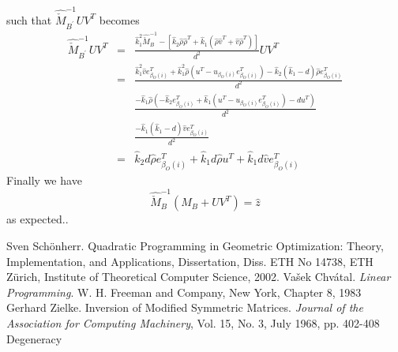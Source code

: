 \documentclass[a4paper]{article}
\begin{document}
such that $\hat{\check{M}}_{B^{\prime}}^{-1}UV^{T}$ becomes
\begin{eqnarray}
\hat{\check{M}}_{B^{\prime}}^{-1}UV^{T}
&=&
\frac{
\hat{k}_{1}^{2}\hat{\check{M}}_{B}^{-1}
-\left[
  \hat{k}_{2}\hat{\rho}\hat{\rho}^{T}
  +\hat{k}_{1}\left(\hat{\rho}\hat{v}^{T} +\hat{v}\hat{\rho}^{T}\right)
 \right]
}{d^{2}}
UV^{T}
\nonumber \\
&=&
\frac{
\hat{k}_{1}^{2}\hat{v}e_{\beta_{O}(i)}^{T}
+\hat{k}_{1}^{2}
\hat{\rho}\left(u^{T}-u_{\beta_{O}(i)}e_{\beta_{O}(i)}^{T}\right)
-\hat{k}_{2}\left(\hat{k}_{1}-d\right)\hat{\rho}e_{\beta_{O}(i)}^{T}
}{d^{2}}
\nonumber \\
&&
\frac{
-\hat{k}_{1}\hat{\rho}
\left(
  -\hat{k}_{2}e_{\beta_{O}(i)}^{T}
  +\hat{k}_{1}
  \left(u^{T}-u_{\beta_{O}(i)}e_{\beta_{O}(i)}^{T}\right)
  -du^{T}
\right)
}{d^{2}}
\nonumber \\
&&
\frac{
-\hat{k}_{1}\left(\hat{k}_{1}-d\right)\hat{v}e_{\beta_{O}(i)}^{T}
}{d^{2}}
\nonumber \\
&=&
\hat{k}_{2}d\hat{\rho}e_{\beta_{O}(i)}^{T}
+\hat{k}_{1}d\hat{\rho} u^{T}
+\hat{k}_{1}d\hat{v}e_{\beta_{O}(i)}^{T}
\end{eqnarray}
Finally we have 
\begin{equation}
\hat{\check{M}}_{B}^{-1}\left(M_{B}+UV^{T}\right)=\hat{z}
\end{equation}
as expected..
\begin{thebibliography}{99}
 Sven Sch\"{o}nherr. Quadratic Programming in Geometric Optimization:
Theory, Implementation, and Applications, Dissertation, Diss. ETH No 14738, ETH
Z\"{u}rich, Institute of Theoretical Computer Science, 2002.
 Va\v{s}ek Chv\'{a}tal. \textit{Linear Programming}. W. H. Freeman and Company,
New York, Chapter 8, 1983 
 Gerhard Zielke. Inversion of Modified Symmetric Matrices. 
\textit{Journal of the Association for Computing Machinery}, Vol. 15, No. 3,
July 1968, pp. 402-408
 Degeneracy
\end{thebibliography}
\end{document}
